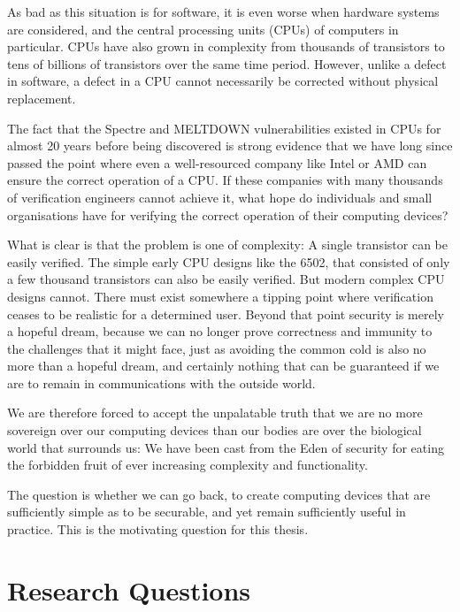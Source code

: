 As bad as this situation is for software, it is even worse when hardware systems are considered, and the central processing units
(CPUs) of computers in particular.  CPUs have also grown in complexity from thousands of transistors to tens of billions of transistors
over the same time period.  However, unlike a defect in software, a defect in a CPU cannot necessarily be corrected without physical
replacement.

The fact that the Spectre and MELTDOWN vulnerabilities existed in CPUs for almost 20 years before being discovered \cite{Spectacular}
is strong evidence that we have long since passed the point where even a well-resourced company like Intel or AMD can ensure
the correct operation of a CPU.  If these companies with many thousands of verification engineers cannot achieve it,
what hope do individuals and small organisations have for verifying the correct operation of their computing devices?

What is clear is that the problem is one of complexity: A single transistor can be easily verified. The simple early CPU designs
like the 6502, that consisted of only a few thousand transistors can also be easily verified.  But modern complex CPU designs cannot.
There must exist somewhere a tipping point where verification ceases to be realistic for a determined user.
Beyond that point security is merely a hopeful dream, because we can no longer prove correctness and immunity to the challenges
that it might face, just as avoiding the common cold is also no more than a hopeful dream, and certainly nothing that can
be guaranteed if we are to remain in communications with the outside world.

We are therefore forced to accept the unpalatable truth that we are no more sovereign over our computing devices than our bodies
are over the biological world that surrounds us: We have been cast from the Eden of security for eating the forbidden fruit of
ever increasing complexity and functionality.

The question is whether we can go back, to create computing devices that are sufficiently simple as to be securable, and yet
remain sufficiently useful in practice.  This is the motivating question for this thesis.

\section{Research Questions}

\label{Ch1 Sec2}

